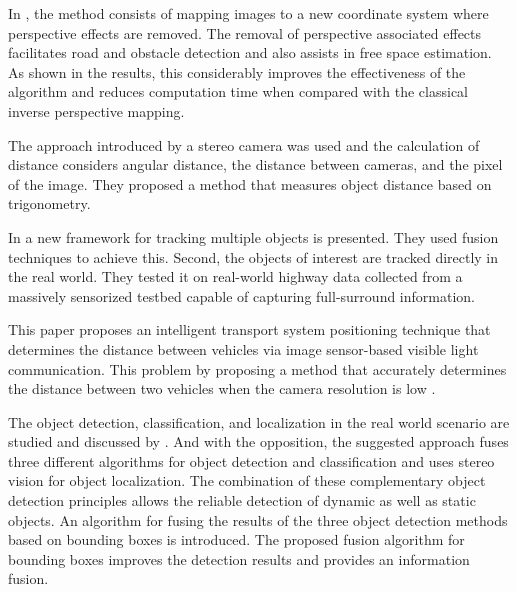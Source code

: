 In \cite{Oliveira2015}, the method consists of mapping images to a new coordinate system where perspective effects are removed. The removal of perspective associated effects facilitates road and obstacle detection and also assists in free space estimation. As shown in the results, this considerably improves the effectiveness of the algorithm and reduces computation time when compared with the classical inverse perspective mapping.

The approach introduced by \cite{Salman2017} a stereo camera was used and the calculation of distance considers angular distance, the distance between cameras, and the pixel of the image. They proposed a method that measures object distance based on trigonometry.   

 In \cite{Rangesh2019} a new framework for tracking multiple objects is presented. They used fusion techniques to achieve this. Second, the objects of interest are tracked directly in the real world. They tested it on real-world highway data collected from a massively sensorized testbed capable of capturing full-surround information.



This paper proposes an intelligent transport system positioning technique that determines the distance between vehicles via image sensor-based visible light communication. This problem by proposing a method that accurately determines the distance between two vehicles when the camera resolution is low \cite{Tram2018}.


The object detection, classification, and localization in the real world scenario are studied and discussed by \cite{Hofmann2019}. And with the opposition, the suggested approach fuses three different algorithms for object detection and classification and uses stereo vision for object localization. The combination of these complementary object detection principles allows the reliable detection of dynamic as well as static objects. An algorithm for fusing the results of the three object detection methods based on bounding boxes is introduced. The proposed fusion algorithm for bounding boxes improves the detection results and provides an information fusion.

